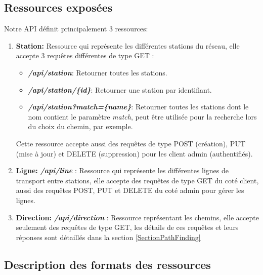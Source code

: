 \subsection{Ressources exposées}
Notre API définit principalement 3 ressources:
\begin{enumerate}
	\item \textbf{Station:} Ressource qui représente les différentes stations du réseau, elle accepte 3 requêtes différentes de type GET  : 
	      \begin{itemize}
	      	\item \emph{\textbf{/api/station}}: Retourner toutes les stations.
	      	\item \emph{\textbf{/api/station/\{id\}}}: Retourner une station par identifiant.
	      	\item \emph{\textbf{/api/station?match=\{name\}}}: Retourner toutes les stations dont le nom contient le paramètre \emph{match}, peut être utilisée pour la recherche lors du choix du chemin, par exemple.
	      \end{itemize}
	      			
	      Cette ressource accepte aussi des requêtes de type POST (création), PUT (mise à jour) et DELETE (suppression)  pour les client admin (authentifiés).
	\item \textbf{Ligne:} \emph{\textbf{/api/line}} : Ressource qui représente les différentes lignes de transport entre stations, elle accepte des requêtes de type GET du coté client, aussi des requêtes POST, PUT et DELETE du coté admin pour gérer les lignes.
	\item \textbf{Direction:}  \emph{\textbf{/api/direction}} : Ressource représentant les chemins, elle accepte seulement des requêtes de type GET, les détails de ces requêtes et leurs réponses sont détaillés dans la section \ref{SectionPathFinding}
\end{enumerate}
\subsection{Description des formats des ressources}
\label{ref:resources}
\lstset{style=JSON}

